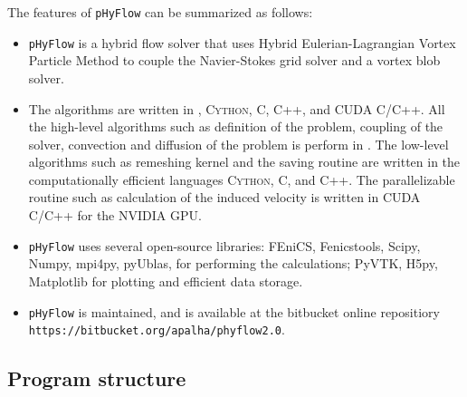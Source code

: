 The features of \texttt{pHyFlow} can be summarized as follows:
\begin{itemize}
\item \texttt{pHyFlow} is a hybrid flow solver that uses Hybrid Eulerian-Lagrangian Vortex Particle Method to couple the Navier-Stokes grid solver and a vortex blob solver.
\item The algorithms are written in \python, \textsc{Cython}, C, C++, and CUDA C/C++. All the high-level algorithms such as definition of the problem, coupling of the solver, convection and diffusion of the problem is perform in \python. The low-level algorithms such as remeshing kernel and the saving routine are written in the computationally efficient languages \textsc{Cython}, C, and C++. The parallelizable routine such as calculation of the induced velocity is written in CUDA C/C++ for the NVIDIA GPU.
\item \texttt{pHyFlow} uses several open-source libraries: FEniCS, Fenicstools, Scipy, Numpy, mpi4py, pyUblas, for performing the calculations; PyVTK, H5py, Matplotlib for plotting and efficient data storage.
\item \texttt{pHyFlow} is maintained, and is available at the bitbucket online repositiory\\ \texttt{https://bitbucket.org/apalha/phyflow2.0}.
\end{itemize}


\subsection{Program structure}

